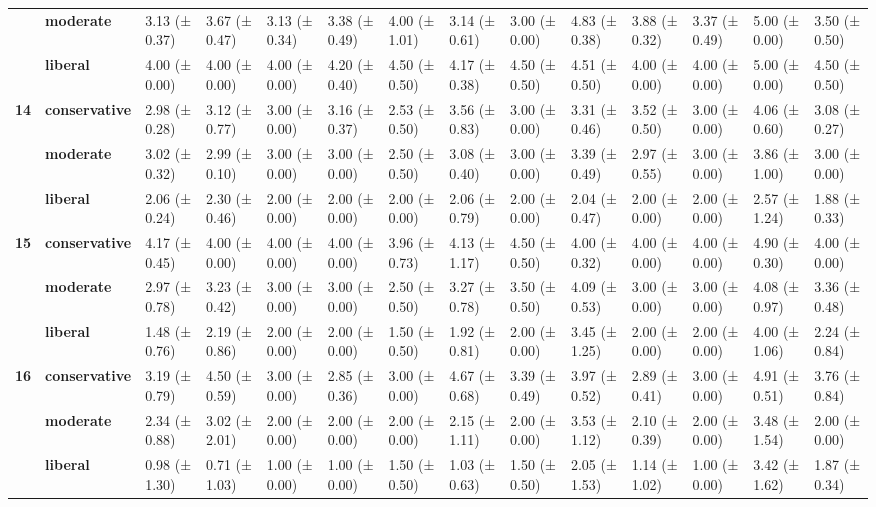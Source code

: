 \begin{longtable}{llllllllllllll}
\textbf{} & \textbf{moderate} & 3.13 (± 0.37) & 3.67 (± 0.47) & 3.13 (± 0.34) & 3.38 (± 0.49) & 4.00 (± 1.01) & 3.14 (± 0.61) & 3.00 (± 0.00) & 4.83 (± 0.38) & 3.88 (± 0.32) & 3.37 (± 0.49) & 5.00 (± 0.00) & 3.50 (± 0.50) \\
\textbf{} & \textbf{liberal} & 4.00 (± 0.00) & 4.00 (± 0.00) & 4.00 (± 0.00) & 4.20 (± 0.40) & 4.50 (± 0.50) & 4.17 (± 0.38) & 4.50 (± 0.50) & 4.51 (± 0.50) & 4.00 (± 0.00) & 4.00 (± 0.00) & 5.00 (± 0.00) & 4.50 (± 0.50) \\
\cline{1-14}
\multirow[t]{3}{*}{\textbf{14}} & \textbf{conservative} & 2.98 (± 0.28) & 3.12 (± 0.77) & 3.00 (± 0.00) & 3.16 (± 0.37) & 2.53 (± 0.50) & 3.56 (± 0.83) & 3.00 (± 0.00) & 3.31 (± 0.46) & 3.52 (± 0.50) & 3.00 (± 0.00) & 4.06 (± 0.60) & 3.08 (± 0.27) \\
\textbf{} & \textbf{moderate} & 3.02 (± 0.32) & 2.99 (± 0.10) & 3.00 (± 0.00) & 3.00 (± 0.00) & 2.50 (± 0.50) & 3.08 (± 0.40) & 3.00 (± 0.00) & 3.39 (± 0.49) & 2.97 (± 0.55) & 3.00 (± 0.00) & 3.86 (± 1.00) & 3.00 (± 0.00) \\
\textbf{} & \textbf{liberal} & 2.06 (± 0.24) & 2.30 (± 0.46) & 2.00 (± 0.00) & 2.00 (± 0.00) & 2.00 (± 0.00) & 2.06 (± 0.79) & 2.00 (± 0.00) & 2.04 (± 0.47) & 2.00 (± 0.00) & 2.00 (± 0.00) & 2.57 (± 1.24) & 1.88 (± 0.33) \\
\cline{1-14}
\multirow[t]{3}{*}{\textbf{15}} & \textbf{conservative} & 4.17 (± 0.45) & 4.00 (± 0.00) & 4.00 (± 0.00) & 4.00 (± 0.00) & 3.96 (± 0.73) & 4.13 (± 1.17) & 4.50 (± 0.50) & 4.00 (± 0.32) & 4.00 (± 0.00) & 4.00 (± 0.00) & 4.90 (± 0.30) & 4.00 (± 0.00) \\
\textbf{} & \textbf{moderate} & 2.97 (± 0.78) & 3.23 (± 0.42) & 3.00 (± 0.00) & 3.00 (± 0.00) & 2.50 (± 0.50) & 3.27 (± 0.78) & 3.50 (± 0.50) & 4.09 (± 0.53) & 3.00 (± 0.00) & 3.00 (± 0.00) & 4.08 (± 0.97) & 3.36 (± 0.48) \\
\textbf{} & \textbf{liberal} & 1.48 (± 0.76) & 2.19 (± 0.86) & 2.00 (± 0.00) & 2.00 (± 0.00) & 1.50 (± 0.50) & 1.92 (± 0.81) & 2.00 (± 0.00) & 3.45 (± 1.25) & 2.00 (± 0.00) & 2.00 (± 0.00) & 4.00 (± 1.06) & 2.24 (± 0.84) \\
\cline{1-14}
\multirow[t]{3}{*}{\textbf{16}} & \textbf{conservative} & 3.19 (± 0.79) & 4.50 (± 0.59) & 3.00 (± 0.00) & 2.85 (± 0.36) & 3.00 (± 0.00) & 4.67 (± 0.68) & 3.39 (± 0.49) & 3.97 (± 0.52) & 2.89 (± 0.41) & 3.00 (± 0.00) & 4.91 (± 0.51) & 3.76 (± 0.84) \\
\textbf{} & \textbf{moderate} & 2.34 (± 0.88) & 3.02 (± 2.01) & 2.00 (± 0.00) & 2.00 (± 0.00) & 2.00 (± 0.00) & 2.15 (± 1.11) & 2.00 (± 0.00) & 3.53 (± 1.12) & 2.10 (± 0.39) & 2.00 (± 0.00) & 3.48 (± 1.54) & 2.00 (± 0.00) \\
\textbf{} & \textbf{liberal} & 0.98 (± 1.30) & 0.71 (± 1.03) & 1.00 (± 0.00) & 1.00 (± 0.00) & 1.50 (± 0.50) & 1.03 (± 0.63) & 1.50 (± 0.50) & 2.05 (± 1.53) & 1.14 (± 1.02) & 1.00 (± 0.00) & 3.42 (± 1.62) & 1.87 (± 0.34) \\
\cline{1-14}
\end{longtable}
